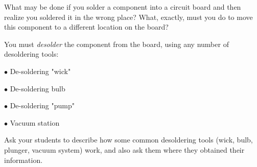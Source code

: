 

What may be done if you solder a component into a circuit board and then realize you soldered it in the wrong place?  What, exactly, must you do to move this component to a different location on the board?







You must {\it desolder} the component from the board, using any number of desoldering tools:

\medskip
\item{$\bullet$} De-soldering "wick"
\item{$\bullet$} De-soldering bulb
\item{$\bullet$} De-soldering "pump"
\item{$\bullet$} Vacuum station
\medskip







Ask your students to describe how some common desoldering tools (wick, bulb, plunger, vacuum system) work, and also ask them where they obtained their information.




